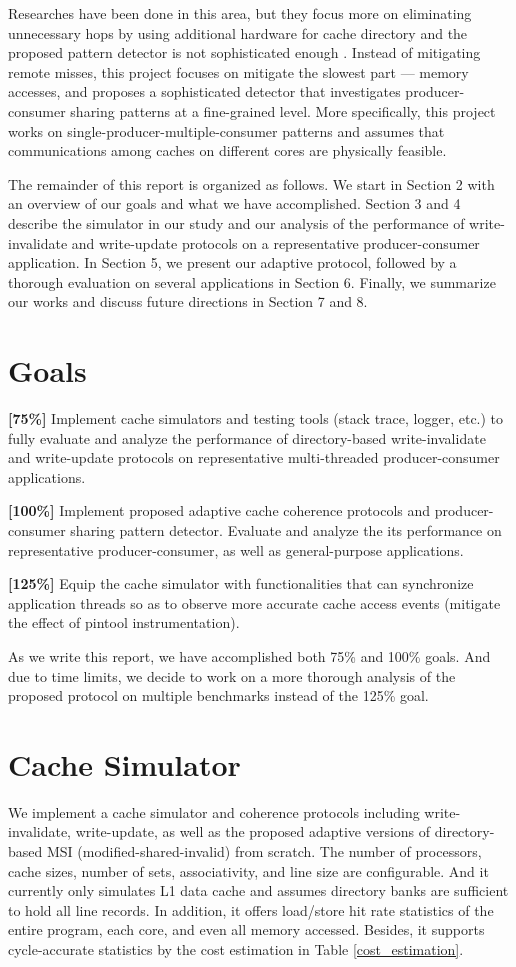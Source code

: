 \documentclass[conference]{IEEEtran}
\begin{document}
Researches have been done in this area, but they focus more on eliminating unnecessary hops by using additional hardware for cache directory and the proposed pattern detector is not sophisticated enough \cite{work1}. Instead of mitigating remote misses, this project focuses on mitigate the slowest part --- memory accesses, and proposes a sophisticated detector that investigates producer-consumer sharing patterns at a fine-grained level. More specifically, this project works on single-producer-multiple-consumer patterns and assumes that communications among caches on different cores are physically feasible.

The remainder of this report is organized as follows. We start in Section 2 with an overview of our goals and what we have accomplished. Section 3 and 4 describe the simulator in our study and our analysis of the performance of write-invalidate and write-update protocols on a representative producer-consumer application. In Section 5, we present our adaptive protocol, followed by a thorough evaluation on several applications in Section 6. Finally, we summarize our works and discuss future directions in Section 7 and 8.


\section{Goals}

\textbf{[75\%]} Implement cache simulators and testing tools (stack trace, logger, etc.) to fully evaluate and analyze the performance of directory-based write-invalidate and write-update protocols on representative multi-threaded producer-consumer applications.

\textbf{[100\%]} Implement proposed adaptive cache coherence protocols and producer-consumer sharing pattern detector. Evaluate and analyze the its performance on representative producer-consumer, as well as general-purpose applications.

\textbf{[125\%]} Equip the cache simulator with functionalities that can synchronize application threads so as to observe more accurate cache access events (mitigate the effect of pintool instrumentation).

As we write this report, we have accomplished both 75\% and 100\% goals. And due to time limits, we decide to work on a more thorough analysis of the proposed protocol on multiple benchmarks instead of the 125\% goal.


\section{Cache Simulator}
We implement a cache simulator and coherence protocols including write-invalidate, write-update, as well as the proposed adaptive versions of directory-based MSI (modified-shared-invalid) from scratch. The number of processors, cache sizes, number of sets, associativity, and line size are configurable. And it currently only simulates L1 data cache and assumes directory banks are sufficient to hold all line records. In addition, it offers load/store hit rate statistics of the entire program, each core, and even all memory accessed. Besides, it supports cycle-accurate statistics by the cost estimation in Table \ref{cost_estimation}.
\end{document}
